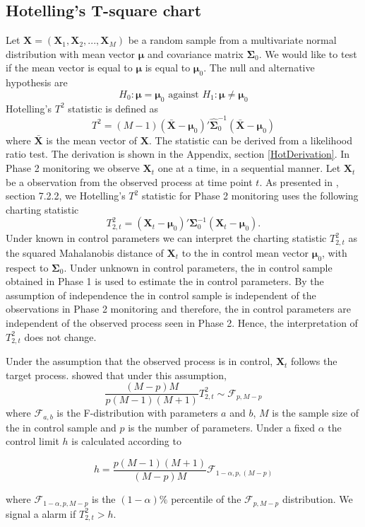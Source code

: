 \subsection{Hotelling's T-square chart}
Let $\mathbf{X}=(\mathbf{X}_1,\mathbf{X}_2,...,\mathbf{X}_M)$ be a random sample from a multivariate normal distribution with mean vector $\boldsymbol{\mu}$ and covariance matrix $\boldsymbol{\Sigma}_0$. We would like to test if the mean vector is equal to $\boldsymbol{\mu}$ is equal to $\boldsymbol{\mu}_0$. The null and alternative hypothesis are 
$$
H_0: \boldsymbol{\mu}=\boldsymbol{\mu}_0 \text{   against   } H_1: \boldsymbol{\mu}\neq\boldsymbol{\mu}_0
$$
Hotelling's $T^2$ statistic is defined as 
$$
T^2 = (M-1)(\bar{\mathbf{X}}-\boldsymbol{\mu}_0)'\widehat{\boldsymbol{\Sigma}}_0^{-1}(\bar{\mathbf{X}}-\boldsymbol{\mu}_0)
$$
where $\bar{\mathbf{X}}$ is the mean vector of $\mathbf{X}$. The statistic can be derived from a likelihood ratio test. The derivation is shown in the Appendix, section \ref{HotDerivation}. In Phase 2 monitoring we observe $\mathbf{X}_t$ one at a time, in a sequential manner. Let $\mathbf{X}_t$ be a observation from the observed process at time point $t$. As presented in \citet{SPCIntro}, section 7.2.2, we Hotelling's $T^2$ statistic for Phase 2 monitoring uses the following charting statistic
$$
T^2_{2,t} = (\mathbf{X}_t-\boldsymbol{\mu}_0)'\boldsymbol{\Sigma}^{-1}_0(\mathbf{X}_t-\boldsymbol{\mu}_0).
$$ 
Under known in control parameters we can interpret the charting statistic $T^2_{2,t}$ as the squared Mahalanobis distance of $\mathbf{X}_t$ to the in control mean vector $\boldsymbol{\mu}_0$, with respect to $\boldsymbol{\Sigma}_0$. Under unknown in control parameters, the in control sample obtained in Phase 1 is used to estimate the in control parameters. By the assumption of independence the in control sample is independent of the observations in Phase 2 monitoring and therefore, the in control parameters are independent of the observed process seen in Phase 2. Hence, the interpretation of $T^2_{2,t}$ does not change. 

Under the assumption that the observed process is in control, $\mathbf{X}_t$ follows the target process. \citet{Tracy1992} showed that under this assumption, 
$$
\frac{(M-p)M}{p(M-1)(M+1)} T^2_{2,t} \sim \mathcal{F}_{p,M-p}
$$
where $\mathcal{F}_{a,b}$ is the F-distribution with parameters $a$ and $b$, $M$ is the sample size of the in control sample and $p$ is the number of parameters. Under a fixed $\alpha$ the control limit $h$ is calculated according to 
\begin{center}
\begin{equation}\label{HotControlLimit}
h=\frac{p(M-1)(M+1)}{(M-p)M}\mathcal{F}_{1-\alpha,p,(M-p)}
\end{equation}
\end{center}
where $\mathcal{F}_{1-\alpha,p,M-p}$ is the $(1-\alpha)\%$ percentile of the $\mathcal{F}_{p,M-p}$ distribution. We signal a alarm if $T^2_{2,t} > h$. 

